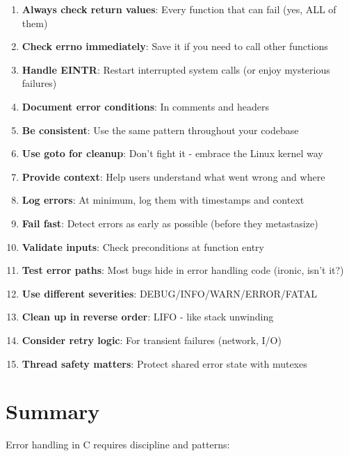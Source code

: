 \begin{enumerate}
    \item \textbf{Always check return values}: Every function that can fail (yes, ALL of them)
    \item \textbf{Check errno immediately}: Save it if you need to call other functions
    \item \textbf{Handle EINTR}: Restart interrupted system calls (or enjoy mysterious failures)
    \item \textbf{Document error conditions}: In comments and headers
    \item \textbf{Be consistent}: Use the same pattern throughout your codebase
    \item \textbf{Use goto for cleanup}: Don't fight it - embrace the Linux kernel way
    \item \textbf{Provide context}: Help users understand what went wrong and where
    \item \textbf{Log errors}: At minimum, log them with timestamps and context
    \item \textbf{Fail fast}: Detect errors as early as possible (before they metastasize)
    \item \textbf{Validate inputs}: Check preconditions at function entry
    \item \textbf{Test error paths}: Most bugs hide in error handling code (ironic, isn't it?)
    \item \textbf{Use different severities}: DEBUG/INFO/WARN/ERROR/FATAL
    \item \textbf{Clean up in reverse order}: LIFO - like stack unwinding
    \item \textbf{Consider retry logic}: For transient failures (network, I/O)
    \item \textbf{Thread safety matters}: Protect shared error state with mutexes
\end{enumerate}

\section{Summary}

Error handling in C requires discipline and patterns:

